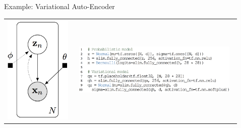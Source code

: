 \documentclass[final]{beamer}
\begin{document}
\begin{frame}[t]
\begin{columns}[t]
\begin{column}{\onecolwid}
\end{column}

\begin{column}{\sepwid}\end{column} %

\begin{column}{\onecolwid}

\begin{block}{Example: Variational Auto-Encoder}
\begin{tabular}{cc}
\hspace{-2.25em}
\includegraphics{img/vae_graph.png}
&
\hspace{-0.5em}
\includegraphics[width=0.95\textwidth]{img/vae_code.png}
\end{tabular}
\vspace{-2ex}
\end{block}


\end{column}
\end{columns}
\end{frame}
\end{document}
